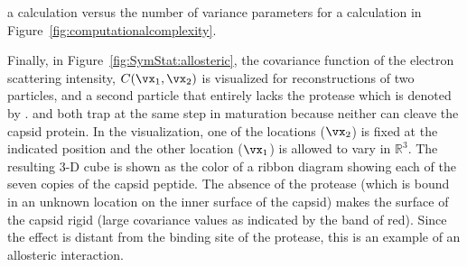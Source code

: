 a {\heteroasymmetry} calculation versus the number of variance parameters
for a {\heterosymstatistics} calculation in
Figure~\ref{fig:computationalcomplexity}.
\par
Finally, in Figure~\ref{fig:SymStat:allosteric}, the covariance function 
of the electron scattering intensity, $\CrhoREAL(\vx_1,\vx_2)$ is
visualized for {\heterosymstatistics} reconstructions of two particles,
{\withpro} and a second particle that entirely lacks the protease which is
denoted by {\withoutpro}.
{\withpro} and {\withoutpro} both trap at the same step in maturation
because neither can cleave the capsid protein.
In the visualization, one of the locations ($\vx_2$) is fixed at the
indicated position and the other location ($\vx_1$) is allowed to vary in
$\mathbb{R}^3$.
The resulting 3-D cube is shown as the color of a ribbon diagram showing
each of the seven copies of the capsid peptide.
The absence of the protease (which is bound in an unknown location on the
inner surface of the capsid) makes the surface of the capsid rigid (large
covariance values as indicated by the band of red).
Since the effect is distant from the binding site of the protease, this is
an example of an allosteric interaction.
